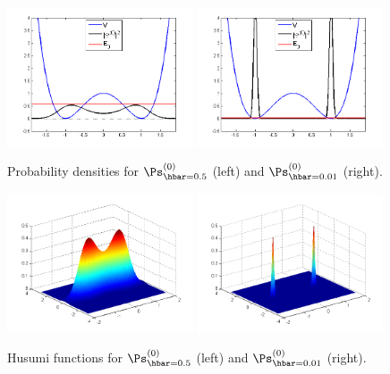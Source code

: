 \documentclass[12pt]{article}
\begin{document}
 \begin{figure}[H]
\begin{center}
\includegraphics[width=0.49\textwidth]{Kl1,hbar=0,5-1.png}
\includegraphics[width=0.49\textwidth]{KL1,hbar=0,01-1.png}
\caption{Probability densities for  $\Ps_{\hbar=0.5}^{(0)}$ (left)  and $\Ps_{\hbar=0.01}^{(0)}$ (right).}
\label{PD}
\end{center}
\end{figure}

 \begin{figure}[H]
\begin{center}
\includegraphics[width=0.49\textwidth]{KL1H2,hbar=0,5.png}
\includegraphics[width=0.49\textwidth]{KL1H2,hbar=0,01-1.png}
\caption{Husumi functions for $\Ps_{\hbar=0.5}^{(0)}$ (left) and  $\Ps_{\hbar=0.01}^{(0)}$ (right).}
\label{HF}
\end{center}
\end{figure}
\newpage
\end{document}
